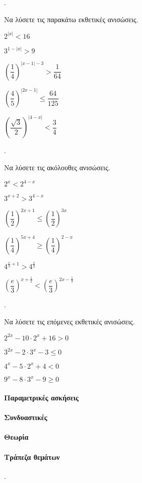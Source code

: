 \documentclass[11pt,a4paper,twocolumn]{article}
\newcounter{askhsh}
\newcommand{\askhsh}{\large\theaskhsh.\ \addtocounter{askhsh}{1}}
\begin{document}
\askhsh Να λύσετε τις παρακάτω εκθετικές ανισώσεις.
\begin{multicols}{2}
\begin{alist}
\item $2^{|x|}<16$
\item $3^{1-|x|}>9$
\item $\left(\dfrac{1}{4}\right)^{|x-1|-3}>\dfrac{1}{64}$
\item $\left(\dfrac{4}{5}\right)^{|2x-1|}\leq\dfrac{64}{125}$
\item $\left(\dfrac{\sqrt{3}}{2}\right)^{|4-x|}<\dfrac{3}{4}$
\end{alist}
\end{multicols}
\askhsh Να λύσετε τις ακόλουθες ανισώσεις.
\begin{multicols}{2}
\begin{alist}[leftmargin=4mm]
\item $2^x<2^{4-x}$
\item $3^{x+2}>3^{4-x}$
\item $\left(\dfrac{1}{2}\right)^{2x+1}\leq\left(\dfrac{1}{2}\right)^{3x}$
\item $\left(\dfrac{1}{4}\right)^{5x+4}\geq\left(\dfrac{1}{4}\right)^{2-x}$
\item $4^{\frac{x}{3}+1}>4^{\frac{x}{2}}$
\item $\left(\dfrac{e}{3}\right)^{x+\frac{1}{2}}<\left(\dfrac{e}{3}\right)^{2x-\frac{1}{3}}$
\end{alist}
\end{multicols}
\askhsh Να λύσετε τις επόμενες εκθετικές ανισώσεις.
\begin{alist}
\item $2^{2x}-10\cdot 2^x+16>0$
\item $3^{2x}-2\cdot 3^{x}-3\leq 0$
\item $4^{x}-5\cdot 2^x+4<0$
\item $9^{x}-8\cdot3^x-9\geq 0$
\end{alist}
\paragraph{Παραμετρικές ασκήσεις}
\paragraph{Συνδυαστικές}
\paragraph{Θεωρία}
\paragraph{Τράπεζα θεμάτων}
\askhsh 
\end{document}
